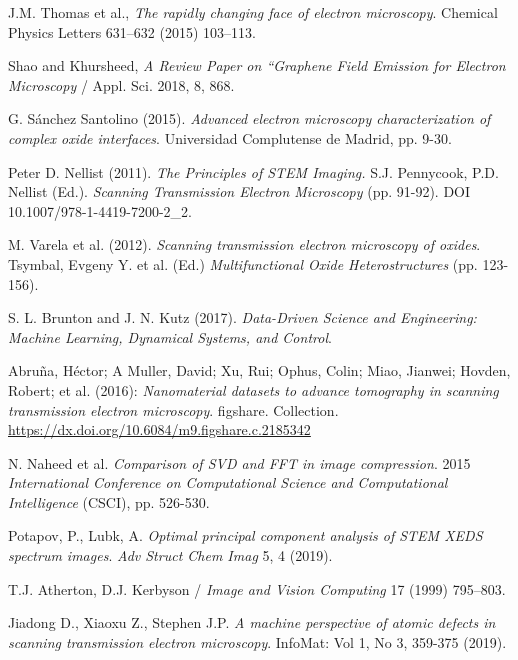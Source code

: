 
 \normalsize



\begin{thebibliography}{9}

J.M. Thomas et al., \textit{The rapidly changing face of electron microscopy}. Chemical Physics Letters 631–632 (2015) 103–113.

Shao and Khursheed, \textit{A Review Paper on “Graphene Field Emission for Electron Microscopy} / Appl. Sci. 2018, 8, 868.

G. Sánchez Santolino (2015). \textit{Advanced electron microscopy characterization of complex oxide interfaces}. Universidad Complutense de Madrid, pp. 9-30.

Peter D. Nellist (2011). \textit{The Principles of STEM Imaging.} S.J. Pennycook, P.D. Nellist (Ed.). \textit{Scanning Transmission Electron Microscopy }(pp. 91-92). DOI 10.1007/978-1-4419-7200-2\_2. 

M. Varela et al. (2012). \textit{Scanning transmission electron microscopy of oxides}. Tsymbal, Evgeny Y. et al. (Ed.) \textit{Multifunctional Oxide Heterostructures} (pp. 123-156).

S. L. Brunton and J. N. Kutz (2017). \textit{Data-Driven Science and Engineering: Machine Learning, Dynamical Systems, and Control}.

Abruña, Héctor; A Muller, David; Xu, Rui; Ophus, Colin; Miao, Jianwei; Hovden, Robert; et al. (2016): \textit{Nanomaterial datasets to advance tomography in scanning transmission electron microscopy}. figshare. Collection. \href{https://dx.doi.org/10.6084/m9.figshare.c.2185342}{https://dx.doi.org/10.6084/m9.figshare.c.2185342}

N. Naheed et al. \textit{Comparison of SVD and FFT in image compression}. 2015 \textit{International Conference on Computational Science and Computational Intelligence} (CSCI), pp. 526-530.

Potapov, P., Lubk, A. \textit{Optimal principal component analysis of STEM XEDS spectrum images}. \textit{Adv Struct Chem Imag} 5, 4 (2019). 

T.J. Atherton, D.J. Kerbyson / \textit{Image and Vision Computing} 17 (1999) 795–803.

Jiadong D., Xiaoxu Z., Stephen J.P. \textit{A machine perspective of atomic defects in scanning transmission electron microscopy}. InfoMat: Vol 1, No 3, 359-375 (2019).


\end{thebibliography}
